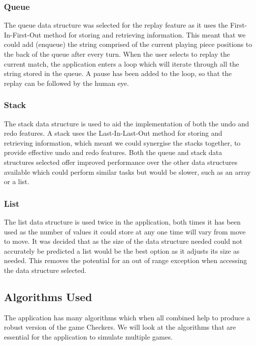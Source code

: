\documentclass[10pt, a4paper]{article}
\begin{document}
    
    
  		\subsubsection{Queue}
  		The queue data structure was selected for the replay feature as it uses the First-In-First-Out method for storing and retrieving information. This meant that we could add (enqueue) the string comprised of the current playing piece positions to the back of the queue after every turn. When the user selects to replay the current match, the application enters a loop which will iterate through all the string stored in the queue. A pause has been added to the loop, so that the replay can be followed by the human eye.
   
      
  		\subsubsection{Stack}
		The stack data structure is used to aid the implementation of both the undo and redo features. A stack uses the Last-In-Last-Out method for storing and retrieving information, which meant we could synergise the stacks together, to provide effective undo and redo features.
  		\newline
  		Both the queue and stack data structures selected offer improved performance over the other data structures available which could perform similar tasks but would be slower, such as an array or a list.
  
      
  		\subsubsection{List}
  		The list data structure is used twice in the application, both times it has been used as the number of values it could store at any one time will vary from move to move. It was decided that as the size of the data structure needed could not accurately be predicted a list would be the best option as it adjusts its size as needed. This removes the potential for an out of range exception when accessing the data structure selected.
    
    
    
 	\subsection{Algorithms Used}
 	The application has many algorithms which when all combined help to produce a robust version of the game Checkers. We will look at the algorithms that are essential for the application to simulate multiple games.
    
\end{document}
